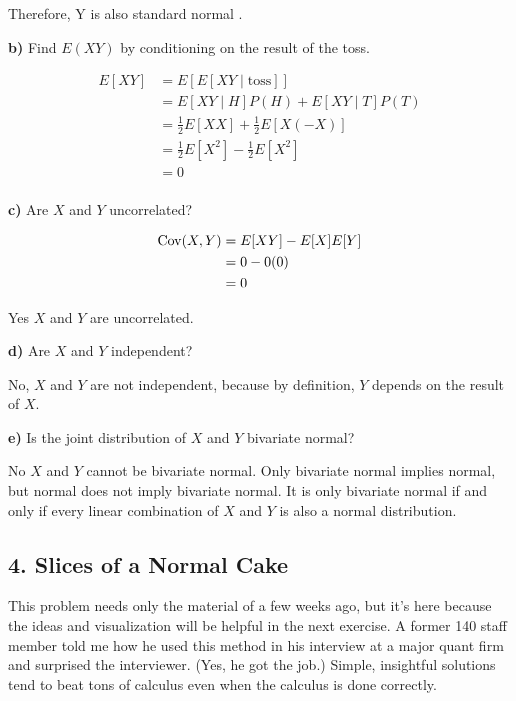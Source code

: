 \documentclass[11pt]{article}
\begin{document}
Therefore, Y is also standard normal .



\textbf{b)} Find \(E(XY)\) by conditioning on the result of the toss.

\begin{align*}
	E[XY] &= E[E[XY \mid \text{toss}]] \\
	&= E[XY \mid H] P(H) + E[XY \mid T]P(T) \\
	&= \frac{1}{2} E[XX] + \frac{1}{2} E[X(-X)]	\\
	&= \frac{1}{2} E[X^{2}] - \frac{1}{2}E[X^{2}] \\
	&= 0  \\
\end{align*}

\textbf{c)} Are \(X\) and \(Y\) uncorrelated?

\begin{align*}
	\operatorname{Cov}(X, Y) &= E[XY] - E[X] E[Y] \\
	&= 0 - 0(0) \\
	&= 0 \\
\end{align*}

Yes $X$ and $Y$ are uncorrelated.


\textbf{d)} Are \(X\) and \(Y\) independent?

No, $X$ and $Y$ are not independent, because by definition, $Y$  depends on the result of $X$.  

\textbf{e)} Is the joint distribution of \(X\) and \(Y\) bivariate
normal?

No $X$ and $Y$ cannot be bivariate normal. Only bivariate normal implies normal, but normal does not imply bivariate normal. It is only bivariate normal if and only if every linear combination of $X$ and $Y$ is also a normal distribution.   

    \newpage

    \hypertarget{slices-of-a-normal-cake}{%
\subsection{4. Slices of a Normal Cake}\label{slices-of-a-normal-cake}}

This problem needs only the material of a few weeks ago, but it's here
because the ideas and visualization will be helpful in the next
exercise. A former 140 staff member told me how he used this method in
his interview at a major quant firm and surprised the interviewer. (Yes,
he got the job.) Simple, insightful solutions tend to beat tons of
calculus even when the calculus is done correctly.
\end{document}
